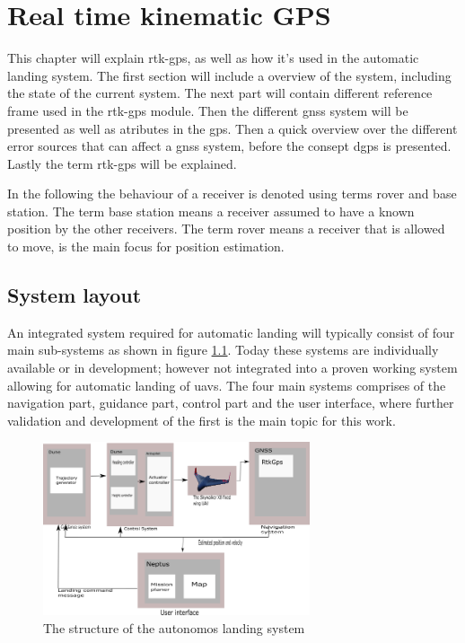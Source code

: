 
\chapter{Real time kinematic GPS}
This chapter will explain \acrfull{rtk-gps}, as well as how it's used in the automatic landing system. The first section will include a overview of the system, including the state of the current system. The next part will contain different reference frame used in the \gls{rtk-gps} module. Then the different \acrfull{gnss} system will be presented as well as atributes in the \acrfull{gps}. Then a quick overview over the different error sources that can affect a \gls{gnss} system, before the consept \acrfull{dgps} is presented. Lastly the term \gls{rtk-gps} will be explained.

In the following the behaviour of a receiver is denoted using terms rover and base station. The term base station means a receiver assumed to have a known position by the other receivers. The term rover means a receiver that is allowed to move, is the main focus for position estimation.
\section{System layout}
An integrated system required for automatic landing will typically consist of four main sub-systems as shown in figure \ref{figure:SystemOverview}. Today these systems are individually available or in development; however not integrated into a proven working system allowing for automatic landing of \glspl{uav}. The four main systems comprises of the navigation part, guidance part, control part and the user interface, where further validation and development of the first is the main topic for this work.

\begin{figure}[H]
	\centering
		\includegraphics[width=0.7\textwidth]{figs/SystemOverview.png}
		\caption{The structure of the autonomos landing system}
		\label{figure:SystemOverview}
\end{figure}

